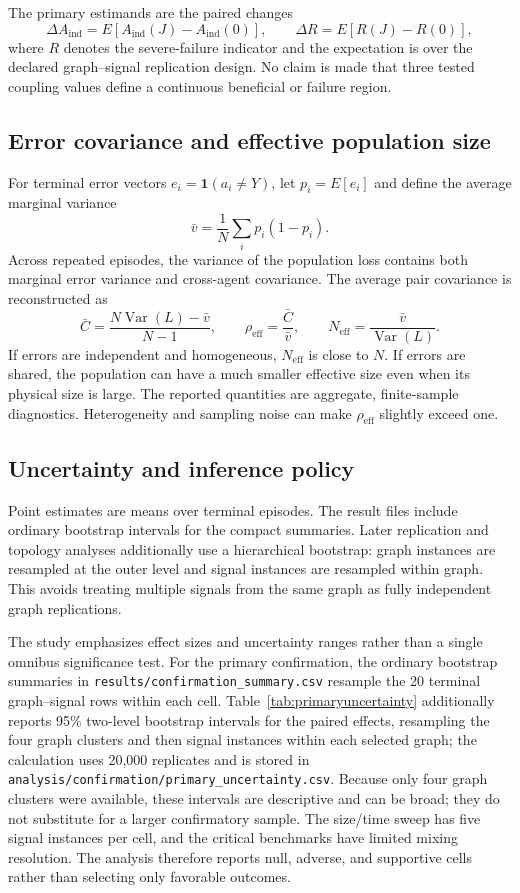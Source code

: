 \documentclass[11pt,a4paper]{article}
\begin{document}
The primary estimands are the paired changes
\[
\Delta A_{\mathrm{ind}}=E[A_{\mathrm{ind}}(J)-A_{\mathrm{ind}}(0)],
\qquad
\Delta R=E[R(J)-R(0)],
\]
where $R$ denotes the severe-failure indicator and the expectation is over the declared graph--signal replication design. No claim is made that three tested coupling values define a continuous beneficial or failure region.

\subsection{Error covariance and effective population size}

For terminal error vectors $e_i=\mathbf{1}(a_i\ne Y)$, let $p_i=E[e_i]$ and define the average marginal variance
\[
\bar v=\frac{1}{N}\sum_i p_i(1-p_i).
\]
Across repeated episodes, the variance of the population loss contains both marginal error variance and cross-agent covariance. The average pair covariance is reconstructed as
\begin{equation}
\bar C=\frac{N\operatorname{Var}(L)-\bar v}{N-1},
\qquad
\rho_{\mathrm{eff}}=\frac{\bar C}{\bar v},
\qquad
N_{\mathrm{eff}}=\frac{\bar v}{\operatorname{Var}(L)}.
\label{eq:neff}
\end{equation}
If errors are independent and homogeneous, $N_{\mathrm{eff}}$ is close to $N$. If errors are shared, the population can have a much smaller effective size even when its physical size is large. The reported quantities are aggregate, finite-sample diagnostics. Heterogeneity and sampling noise can make $\rho_{\mathrm{eff}}$ slightly exceed one.

\subsection{Uncertainty and inference policy}

Point estimates are means over terminal episodes. The result files include ordinary bootstrap intervals for the compact summaries. Later replication and topology analyses additionally use a hierarchical bootstrap: graph instances are resampled at the outer level and signal instances are resampled within graph. This avoids treating multiple signals from the same graph as fully independent graph replications.

The study emphasizes effect sizes and uncertainty ranges rather than a single omnibus significance test. For the primary confirmation, the ordinary bootstrap summaries in \texttt{results/confirmation\_summary.csv} resample the 20 terminal graph--signal rows within each cell. Table~\ref{tab:primaryuncertainty} additionally reports 95\% two-level bootstrap intervals for the paired effects, resampling the four graph clusters and then signal instances within each selected graph; the calculation uses 20,000 replicates and is stored in \texttt{analysis/confirmation/primary\_uncertainty.csv}. Because only four graph clusters were available, these intervals are descriptive and can be broad; they do not substitute for a larger confirmatory sample. The size/time sweep has five signal instances per cell, and the critical benchmarks have limited mixing resolution. The analysis therefore reports null, adverse, and supportive cells rather than selecting only favorable outcomes.
\end{document}
